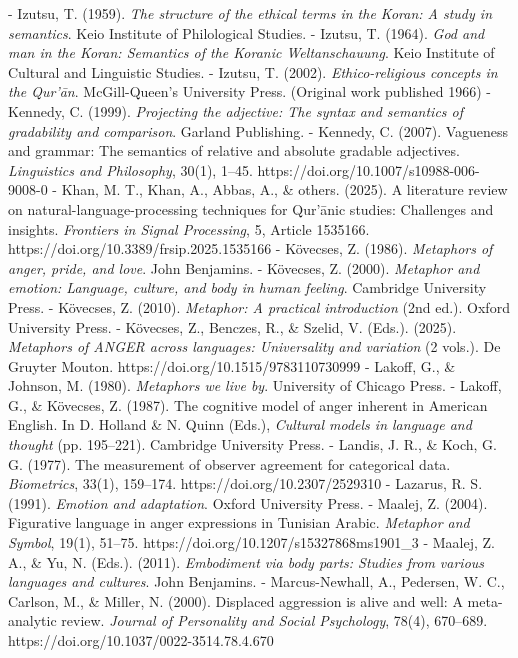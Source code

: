 \documentclass[12pt,a4paper]{article}
\begin{document}
\begin{RTL}
\begin{otherlanguage}{persian}
\begin{LTR}
- Izutsu, T. (1959). \emph{The structure of the ethical terms in the Koran: A study in semantics}. Keio Institute of Philological Studies.
- Izutsu, T. (1964). \emph{God and man in the Koran: Semantics of the Koranic Weltanschauung}. Keio Institute of Cultural and Linguistic Studies.
- Izutsu, T. (2002). \emph{Ethico-religious concepts in the Qur’ān}. McGill-Queen’s University Press. (Original work published 1966)
- Kennedy, C. (1999). \emph{Projecting the adjective: The syntax and semantics of gradability and comparison}. Garland Publishing.
- Kennedy, C. (2007). Vagueness and grammar: The semantics of relative and absolute gradable adjectives. \emph{Linguistics and Philosophy}, 30(1), 1–45. https://doi.org/10.1007/s10988-006-9008-0
- Khan, M. T., Khan, A., Abbas, A., \& others. (2025). A literature review on natural-language-processing techniques for Qur’ānic studies: Challenges and insights. \emph{Frontiers in Signal Processing}, 5, Article 1535166. https://doi.org/10.3389/frsip.2025.1535166
- Kövecses, Z. (1986). \emph{Metaphors of anger, pride, and love}. John Benjamins.
- Kövecses, Z. (2000). \emph{Metaphor and emotion: Language, culture, and body in human feeling}. Cambridge University Press.
- Kövecses, Z. (2010). \emph{Metaphor: A practical introduction} (2nd ed.). Oxford University Press.
- Kövecses, Z., Benczes, R., \& Szelid, V. (Eds.). (2025). \emph{Metaphors of ANGER across languages: Universality and variation} (2 vols.). De Gruyter Mouton. https://doi.org/10.1515/9783110730999
- Lakoff, G., \& Johnson, M. (1980). \emph{Metaphors we live by}. University of Chicago Press.
- Lakoff, G., \& Kövecses, Z. (1987). The cognitive model of anger inherent in American English. In D. Holland \& N. Quinn (Eds.), \emph{Cultural models in language and thought} (pp. 195–221). Cambridge University Press.
- Landis, J. R., \& Koch, G. G. (1977). The measurement of observer agreement for categorical data. \emph{Biometrics}, 33(1), 159–174. https://doi.org/10.2307/2529310
- Lazarus, R. S. (1991). \emph{Emotion and adaptation}. Oxford University Press.
- Maalej, Z. (2004). Figurative language in anger expressions in Tunisian Arabic. \emph{Metaphor and Symbol}, 19(1), 51–75. https://doi.org/10.1207/s15327868ms1901\_3
- Maalej, Z. A., \& Yu, N. (Eds.). (2011). \emph{Embodiment via body parts: Studies from various languages and cultures}. John Benjamins.
- Marcus-Newhall, A., Pedersen, W. C., Carlson, M., \& Miller, N. (2000). Displaced aggression is alive and well: A meta-analytic review. \emph{Journal of Personality and Social Psychology}, 78(4), 670–689. https://doi.org/10.1037/0022-3514.78.4.670

\end{LTR}
\end{otherlanguage}
\end{RTL}
\end{document}
